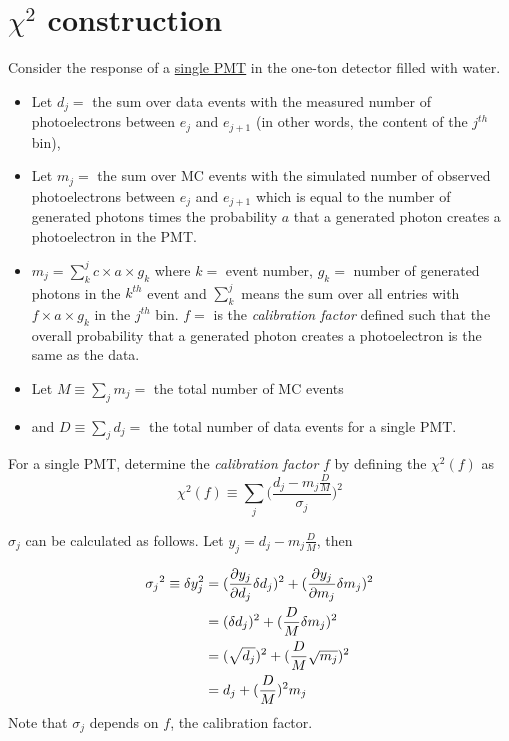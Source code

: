 \documentclass[12pt]{article}
\begin{document}
\section{$\chi^2$ construction \label{sec:chisq}}
Consider the response of a \underline{single PMT} in the one-ton detector filled with water.
  \begin{itemize}
	\item Let $d_j = $ the sum over data events with the measured number of photoelectrons between $e_j$ and 	
	$e_{j+1}$ (in other words, the content of the $j^{th}$ bin),
	\item Let $m_j = $ the sum over MC events with the simulated number of observed photoelectrons 
	between $e_j$ and $e_{j+1}$ which is equal to the number of generated photons times the probability $a$ that
	a generated photon creates a photoelectron in the PMT.
	\item $m_j  = \sum_k^j c\times a\times g_k$ 
	where $k=$ event number, 
	$g_k = $ number of generated photons in the $k^{th}$ event and 
	$\sum_k^j$ means the sum over all entries with 
	$f\times a\times g_k$ in the $j^{th}$ bin. 
	$f=$ is the {\em calibration factor} defined such that the overall probability that a generated photon creates a photoelectron is the same as the data. 
	\item Let $M \equiv \sum_j m_j = $ the total number of MC events 
	\item and $D \equiv \sum_j d_j = $ the total number of data events for a single PMT.
	
\end{itemize}
For a single PMT, determine the {\em calibration factor} $f$ by defining the $\chi^2(f)$ as
\begin{equation}\label{eqn:chisq}
	\chi^2(f) \equiv \sum_j \bigl( \frac{d_j - m_j \frac{D}{M}}{\sigma_j} \bigr)^2
\end{equation}

$\sigma_j$ can be calculated as follows. Let $y_j = d_j - m_j\frac{D}{M}$, then

\begin{eqnarray}
\sigma_{\color{black}j}^{\color{black}2} \equiv \delta y_j^2 &= (\frac{\partial y_j}{\partial d_j} \delta d_j)^2 + (\frac{\partial y_j}{\partial m_j} \delta m_j)^2  \\
                    &=(\delta d_j)^2 + (\frac{D}{M} \delta m_j)^2 \\
                    &=(\sqrt{d_j})^2 + (\frac{D}{M} \sqrt{m_j})^2 \\
                    &= d_j + (\frac{D}{M})^2 m_j
\end{eqnarray}
Note that $\sigma_j$ depends on $f$, the calibration factor. 
\end{document}
